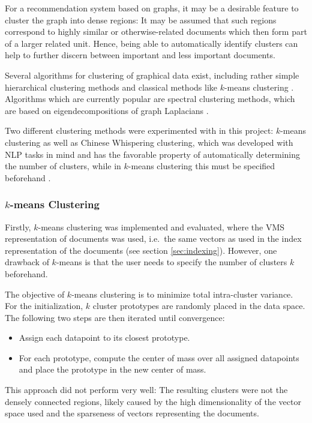 For a recommendation system based on graphs, it may be a desirable feature to cluster the graph into
dense regions: It may be assumed that such regions correspond to highly similar or otherwise-related
documents which then form part of a larger related unit. Hence, being able to
automatically identify clusters can help to further discern between important and less important
documents.

Several algorithms for clustering of graphical data exist, including rather simple
hierarchical clustering methods and classical methods like $k$-means clustering
\cite{eosl2}. Algorithms which are currently popular are spectral clustering
methods, which are based on eigendecompositions of graph Laplacians \cite{spectral_clustering}.

Two different clustering methods were experimented with in this project: $k$-means clustering
as well as Chinese Whispering clustering, which was developed with NLP tasks in mind and has the
favorable property of automatically determining the number of clusters, while in $k$-means clustering this must be specified beforehand \cite{cw_clustering}.

\subsubsection{$k$-means Clustering}
\label{sec:k-means_clustering}
Firstly, $k$-means clustering was implemented and evaluated, where the VMS representation of
documents was used, i.e.\ the same vectors as used in the index representation of the documents (see
section \ref{sec:indexing}). However, one drawback of $k$-means is that the user needs to specify
the number of clusters $k$ beforehand.

The objective of $k$-means clustering is to minimize total intra-cluster variance. For the
initialization, $k$ cluster prototypes are randomly placed in the data space. The following two
steps are then iterated until convergence:
\begin{itemize}
  \item Assign each datapoint to its closest prototype.
  \item For each prototype, compute the center of mass over all assigned datapoints and place the
prototype in the new center of mass.
\end{itemize}

This approach did not perform very well: The resulting clusters were not the densely connected
regions, likely caused by the high dimensionality of the vector space used
and the sparseness of vectors representing the documents.

